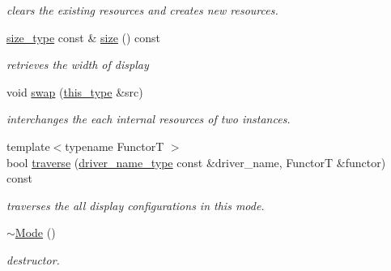 \begin{DoxyCompactItemize}
\begin{DoxyCompactList}\small\item\em clears the existing resources and creates new resources. \end{DoxyCompactList}\item 
\hypertarget{classhryky_1_1display_1_1_mode_aebf3abe6a97f73877f40dfb3ebb7053f}{\hyperlink{namespacehryky_1_1display_a88ee3bfa154cce4c6715af0c3f53d062}{size\-\_\-type} const \& \hyperlink{classhryky_1_1display_1_1_mode_aebf3abe6a97f73877f40dfb3ebb7053f}{size} () const }\label{classhryky_1_1display_1_1_mode_aebf3abe6a97f73877f40dfb3ebb7053f}

\begin{DoxyCompactList}\small\item\em retrieves the width of display \end{DoxyCompactList}\item 
\hypertarget{classhryky_1_1display_1_1_mode_a11210bd14d8f1f4c64ff4ba93c51cc48}{void \hyperlink{classhryky_1_1display_1_1_mode_a11210bd14d8f1f4c64ff4ba93c51cc48}{swap} (\hyperlink{classhryky_1_1display_1_1_mode_a0c68f6c39098781552942da1586968bc}{this\-\_\-type} \&src)}\label{classhryky_1_1display_1_1_mode_a11210bd14d8f1f4c64ff4ba93c51cc48}

\begin{DoxyCompactList}\small\item\em interchanges the each internal resources of two instances. \end{DoxyCompactList}\item 
\hypertarget{classhryky_1_1display_1_1_mode_a3b1659edc90d32f841bcd30be0d925f2}{{\footnotesize template$<$typename Functor\-T $>$ }\\bool \hyperlink{classhryky_1_1display_1_1_mode_a3b1659edc90d32f841bcd30be0d925f2}{traverse} (\hyperlink{namespacehryky_1_1display_a393bfca9f51ab987a1e795c8502c4db4}{driver\-\_\-name\-\_\-type} const \&driver\-\_\-name, Functor\-T \&functor) const }\label{classhryky_1_1display_1_1_mode_a3b1659edc90d32f841bcd30be0d925f2}

\begin{DoxyCompactList}\small\item\em traverses the all display configurations in this mode. \end{DoxyCompactList}\item 
\hypertarget{classhryky_1_1display_1_1_mode_a7d4d028e408e4f498865ba7c749f9d7b}{\hyperlink{classhryky_1_1display_1_1_mode_a7d4d028e408e4f498865ba7c749f9d7b}{$\sim$\-Mode} ()}\label{classhryky_1_1display_1_1_mode_a7d4d028e408e4f498865ba7c749f9d7b}

\begin{DoxyCompactList}\small\item\em destructor. \end{DoxyCompactList}\end{DoxyCompactItemize}


